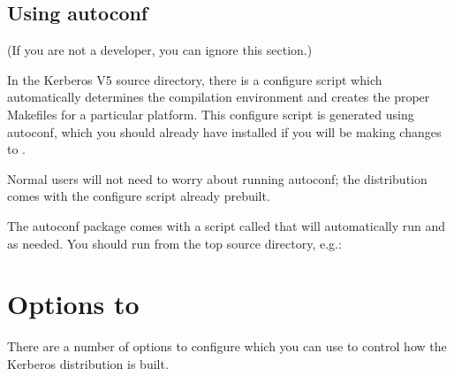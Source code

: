 \documentclass[letterpaper,10pt,english]{sphinxmanual}
\begin{document}
\subsection{Using autoconf}
\label{\detokenize{build/doing_build:using-autoconf}}
(If you are not a developer, you can ignore this section.)

In the Kerberos V5 source directory, there is a configure script which
automatically determines the compilation environment and creates the
proper Makefiles for a particular platform.  This configure script is
generated using autoconf, which you should already have installed if
you will be making changes to .

Normal users will not need to worry about running autoconf; the
distribution comes with the configure script already prebuilt.

The autoconf package comes with a script called  that
will automatically run  and  as needed.  You
should run  from the top source directory, e.g.:

%
\begin{sphinxVerbatim}[commandchars=\\\{\}]
 
 
\end{sphinxVerbatim}


\section{Options to }
\label{\detokenize{build/options2configure:options2configure}}\label{\detokenize{build/options2configure::doc}}\label{\detokenize{build/options2configure:options-to-configure}}
There are a number of options to configure which you can use to
control how the Kerberos distribution is built.
\end{document}
